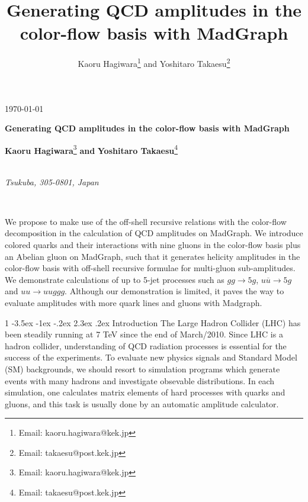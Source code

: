 \documentclass[a4paper,11pt]{article}
\title{Generating QCD amplitudes in the color-flow basis with MadGraph}
\author{Kaoru Hagiwara\footnote{Email: kaoru.hagiwara@kek.jp} and
Yoshitaro Takaesu\footnote{Email: takaesu@post.kek.jp}}
\makeatletter
\renewcommand{\section}{%
  \@startsection{section}%
   {1}%
   {\z@}%
   {-3.5ex \@plus -1ex \@minus -.2ex}%
   {2.3ex \@plus.2ex}%
   {\normalfont\large\bfseries}%
}%
\makeatother
\begin{document}
\begin{titlepage}
\begin{flushright}
\today\\
\end{flushright}
\begin{center}
\vspace{15em}
{\LARGE {\bf Generating QCD amplitudes in the color-flow basis with MadGraph}}

\vspace{5em}
{\rm\Large {\bf Kaoru Hagiwara}}\footnote{Email: kaoru.hagiwara@kek.jp} {\bf\Large and}
 {\rm\Large {\bf Yoshitaro Takaesu}}\footnote{Email: takaesu@post.kek.jp}

\vspace{1em}
\\
{\it Tsukuba, 305-0801, Japan}

\vspace{9em}
\\
 \end{center}
We propose to make use of the off-shell
recursive relations with the color-flow decomposition in the calculation of QCD amplitudes on
MadGraph. We introduce colored quarks and their interactions with nine
gluons in the color-flow basis plus an Abelian gluon on MadGraph, such
that it generates helicity amplitudes in the color-flow basis with off-shell recursive
formulae for multi-gluon sub-amplitudes. We demonstrate calculations of up to 5-jet processes such as
$gg\rightarrow 5g$, $u\overline{u}\rightarrow 5g$ and $uu\rightarrow uuggg$. Although our
demonstration is limited, it paves the way to evaluate amplitudes with
more quark lines and gluons with Madgraph.
\end{titlepage}

\section{Introduction}
\label{intro}
The Large Hadron Collider (LHC) has been steadily running at 7 TeV since the
end of March/2010. Since LHC is a hadron
collider, understanding of QCD radiation processes is essential for the success of the experiments. To evaluate new physics signals
and Standard Model (SM) backgrounds, we should resort to simulation programs which generate
events with many hadrons and investigate obsevable distributions. In each simulation,
one calculates matrix elements of hard processes with quarks and gluons,
and this task is usually done by an automatic amplitude calculator.
\end{document}
